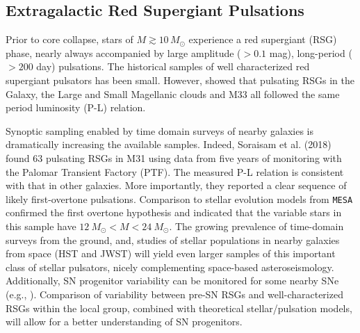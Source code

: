 \subsection{Extragalactic Red Supergiant Pulsations}

Prior to core collapse, stars of $M \! \gtrsim \! 10 \, M_\odot$ experience a red
supergiant (RSG) phase, nearly always accompanied by large amplitude
($>0.1$ mag), long-period ($>200 $ day) pulsations.  
The historical samples of well characterized red supergiant pulsators has been small. However, \citet{Yang_2012} showed that pulsating RSGs in the Galaxy, the Large and Small Magellanic clouds and M33 all followed the
same period luminosity (P-L) relation.

Synoptic sampling enabled by time domain surveys of
nearby galaxies is dramatically increasing the available samples. Indeed, Soraisam et al. (2018) found 63 pulsating RSGs in M31 using data from five years of
monitoring with the Palomar Transient Factory (PTF). The measured P-L
relation is consistent with that in other galaxies. 
{\color{green} More importantly, they reported a clear sequence of likely first-overtone
pulsations. Comparison to stellar evolution models from \texttt{MESA}
confirmed the first overtone hypothesis and indicated that} the
variable stars in this sample have $12~M_{\odot} \! < \! M \! < \! 24~M_{\odot}$. The growing prevalence of time-domain surveys from the ground, and, studies 
of stellar populations in nearby galaxies from space (HST and JWST) 
will yield even larger samples of this important class of stellar pulsators, nicely complementing space-based asteroseismology. Additionally, SN progenitor variability can be monitored for some nearby SNe (e.g., \citealt{kochanek:17}). Comparison of variability between pre-SN RSGs and well-characterized RSGs within the local group, combined with theoretical stellar/pulsation models, will allow for a better understanding of SN progenitors.